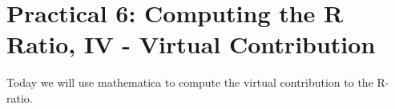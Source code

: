 \section*{Practical 6: Computing the R Ratio, IV - Virtual Contribution }
Today we will use mathematica to compute the virtual contribution to the R-ratio.